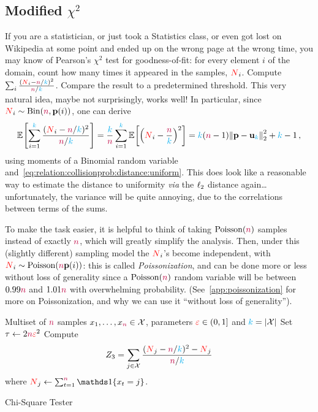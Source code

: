 \subsection{Modified $\chi^2$}
  \label{ssec:uniformity:chisquare}  If you are a statistician, or just took a Statistics class, or even got lost on Wikipedia at some point and ended up on the wrong page at the wrong time, you may know of Pearson's $\chi^2$ test for goodness-of-fit: for every element $i$ of the domain, count how many times it appeared in the samples, $\occur_i$. Compute $\sum_{i} \frac{(\occur_i-\ns/\ab)^2}{\ns/\ab}$. Compare the result to a predetermined threshold. This very natural idea, maybe not surprisingly, works well! In particular, since $\occur_i \sim \binomial{\ns}{\p(i)}$, one can derive
\[
\bEE{ \sum_{i=1}^\ab \frac{(\occur_i-\ns/\ab)^2}{\ns/\ab} } = \frac{\ab}{\ns}\sum_{i=1}^\ab \bEE{ \Paren{\occur_i-\frac{\ns}{\ab}}^2 } = \ab(\ns-1)\normtwo{\p-\uniform_\ab}^2 + \ab-1\,,
\]
using moments of a Binomial random variable and~\cref{eq:relation:collisionprob:distance:uniform}. This does look like a reasonable way to estimate the distance to uniformity \emph{via} the $\lp[2]$ distance again\dots{} unfortunately, the variance will be quite annoying, due to the correlations between terms of the sums.

To make the task easier, it is helpful to think of taking $\poisson{\ns}$ samples instead of exactly $\ns$, which will greatly simplify the analysis. Then, under this (slightly different) sampling model the $\occur_i$'s become independent, with $\occur_i\sim\poisson{\ns\p(i)}$: this is called \emph{Poissonization}, and can be done more or less without loss of generality since a $\poisson{\ns}$ random variable will be between $0.99\ns$ and $1.01\ns$ with overwhelming probability. (See~\cref{app:poissonization} for more on Poissonization, and why we can use it ``without loss of generality'').

\begin{algorithm}[ht!]
  \begin{algorithmic}[1]
    \Require Multiset of $\ns$ samples $x_1,\dots,x_\ns \in \domain$, parameters $\dst\in(0,1]$ and $\ab = \abs{\domain}$
    \State Set $\tau \gets 2\ns\dst^2$
    \State Compute 
    \[
        Z_3 = \sum_{j\in\domain} \frac{(\occur_j-\ns/\ab)^2-\occur_j}{\ns/\ab}
    \] where $\occur_j \gets \sum_{t=1}^\ns\indic{x_t=j}$.
     \Return \reject {}
    \Else\ 
      \Return \accept {}
    \EndIf
  \end{algorithmic}
  \caption{\label{algo:chisquare}\sc Chi-Square Tester}
\end{algorithm}

